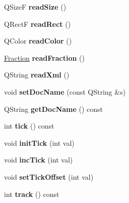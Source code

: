 \begin{DoxyCompactItemize}
Q\+SizeF {\bfseries read\+Size} ()
\item 
\mbox{\label{class_ms_1_1_xml_reader_ac009a9e29f39651c5a36664a9ef0a726}} 
Q\+RectF {\bfseries read\+Rect} ()
\item 
\mbox{\label{class_ms_1_1_xml_reader_ab14e93c28fec89eb825c49628fcc44c0}} 
Q\+Color {\bfseries read\+Color} ()
\item 
\mbox{\label{class_ms_1_1_xml_reader_a286083632b01d0f3e31b140be4644247}} 
\hyperlink{class_ms_1_1_fraction}{Fraction} {\bfseries read\+Fraction} ()
\item 
\mbox{\label{class_ms_1_1_xml_reader_aba5278d5e0ea57dde16e2e970fdfcda2}} 
Q\+String {\bfseries read\+Xml} ()
\item 
\mbox{\label{class_ms_1_1_xml_reader_a86af1cd58e5becba7d9eebe074e5447e}} 
void {\bfseries set\+Doc\+Name} (const Q\+String \&s)
\item 
\mbox{\label{class_ms_1_1_xml_reader_a9eef733ca713123e9634ea89f7cac8a0}} 
Q\+String {\bfseries get\+Doc\+Name} () const
\item 
\mbox{\label{class_ms_1_1_xml_reader_a57c31780b8917fe07e9d730b91a3068e}} 
int {\bfseries tick} () const
\item 
\mbox{\label{class_ms_1_1_xml_reader_adef5d0f64f6faa96f83db3741f89c708}} 
void {\bfseries init\+Tick} (int val)
\item 
\mbox{\label{class_ms_1_1_xml_reader_ae3bea73d571abd214b508e54801373e8}} 
void {\bfseries inc\+Tick} (int val)
\item 
\mbox{\label{class_ms_1_1_xml_reader_a29fbf94ca728e903b189d4f196969242}} 
void {\bfseries set\+Tick\+Offset} (int val)
\item 
\mbox{\label{class_ms_1_1_xml_reader_a6a8145d54a03a3de24a025e570748946}} 
int {\bfseries track} () const

\end{DoxyCompactItemize}

